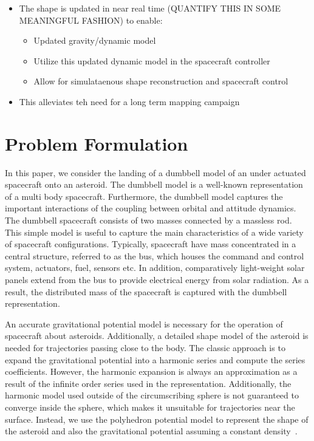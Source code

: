 \documentclass[letterpaper, paper,11pt]{AAS}		%
\begin{document}
\begin{enumerate}
\begin{itemize}
            \item The shape is updated in near real time (QUANTIFY THIS IN SOME MEANINGFUL FASHION) to  enable:
                \begin{itemize}
                    \item Updated gravity/dynamic model 
                    \item Utilize this updated dynamic model in the spacecraft controller
                    \item Allow for simulataenous shape reconstruction and spacecraft control
                \end{itemize}
            \item This alleviates teh need for a long term mapping campaign
        \end{itemize}
\end{enumerate}

\section{Problem Formulation}\label{sec:problem}
In this paper, we consider the landing of a dumbbell model of an under actuated spacecraft onto an asteroid.
The dumbbell model is a well-known representation of a multi body spacecraft.
Furthermore, the dumbbell model captures the important interactions of the coupling between orbital and attitude dynamics. 
The dumbbell spacecraft consists of two masses connected by a massless rod.
This simple model is useful to capture the main characteristics of a wide variety of spacecraft configurations.
Typically, spacecraft have mass concentrated in a central structure, referred to as the bus, which houses the command and control system, actuators, fuel, sensors etc. 
In addition, comparatively light-weight solar panels extend from the bus to provide electrical energy from solar radiation. 
As a result, the distributed mass of the spacecraft is captured with the dumbbell representation.

An accurate gravitational potential model is necessary for the operation of spacecraft about asteroids.
Additionally, a detailed shape model of the asteroid is needed for trajectories passing close to the body.
The classic approach is to expand the gravitational potential into a harmonic series and compute the series coefficients.
However, the harmonic expansion is always an approximation as a result of the infinite order series used in the representation.
Additionally, the harmonic model used outside of the circumscribing sphere is not guaranteed to converge inside the sphere, which makes it unsuitable for trajectories near the surface.
Instead, we use the polyhedron potential model to represent the shape of the asteroid and also the gravitational potential assuming a constant density~\cite{werner1994,werner1997}. 
\end{document}
